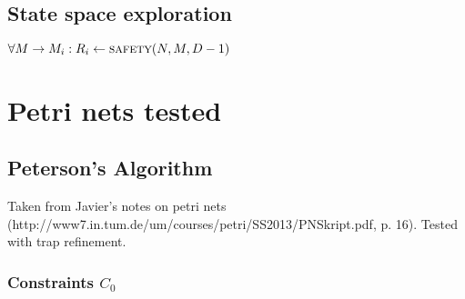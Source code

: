 \documentclass{scrartcl}
\begin{document}
\subsection{State space exploration}
\begin{algorithmic}[1]
    \State \Return {}
    \State \Return {}
    \State \Return {}
  \Else
    \State $\forall M \rightarrow M_i: R_i \gets \Call{safety}{N, M, D-1}$
      \State \Return {}
      \State \Return {}
    \Else {}
      \State \Return {}
    \EndIf
  \EndIf
\EndFunction
\end{algorithmic}

\section{Petri nets tested}

\subsection{Peterson's Algorithm}

Taken from Javier's notes on petri nets
(http://www7.in.tum.de/um/courses/petri/SS2013/PNSkript.pdf, p. 16).
Tested with trap refinement.

\subsubsection{Constraints $C_0$}
\end{document}

